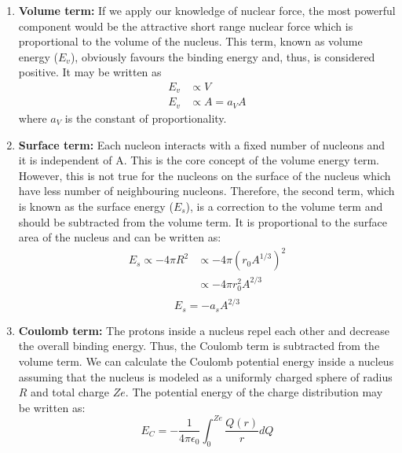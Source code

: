 \begin{enumerate}[label=\textbf{\Alph*.}]

    \item \textbf{Volume term:}     If we apply our knowledge of nuclear force, the most powerful component would be the attractive short range nuclear force which is proportional to the volume of the nucleus. This term, known as volume energy ($E_v$), obviously favours the binding energy and, thus, is considered positive. It may be written as
        \begin{equation}
            \begin{split}
                E_v &\propto V\\
                E_v &\propto A = a_VA
            \end{split}    
        \end{equation}
        where $a_V$ is the constant of proportionality.

    \item \textbf{Surface term:}    Each nucleon interacts with a fixed number of nucleons and it is independent of A. This is the core concept of the volume energy term. However, this is not true for the nucleons on the surface of the nucleus which have less number of neighbouring nucleons. Therefore, the second term, which is known as the surface energy ($E_s$), is a correction to the volume term and should be subtracted from the volume term. It is proportional to the surface area of the nucleus and can be written as:
        \begin{equation}
            \begin{split}
                E_s \propto -4\pi R^2 &\propto -4 \pi (r_0A^{1/3})^2\\&\propto -4 \pi r_0^2 A^{2/3}\\
            \end{split}
        \end{equation}
        \begin{equation}
            E_s = -a_sA^{2/3}
        \end{equation}
    
    \item \textbf{Coulomb term:}    The protons inside a nucleus repel each other and decrease the overall binding energy. Thus, the Coulomb term is subtracted from the volume term. We can calculate the Coulomb potential energy inside a nucleus assuming that the nucleus is modeled as a uniformly charged sphere of radius $R$ and total charge $Ze$.  The potential energy of the charge distribution may be written as:
        \begin{equation}
            E_C = -\frac{1}{4 \pi \epsilon_0}  \int_0^{Ze} \frac{Q(r)}{r}dQ
        \end{equation}
    

\end{enumerate}
